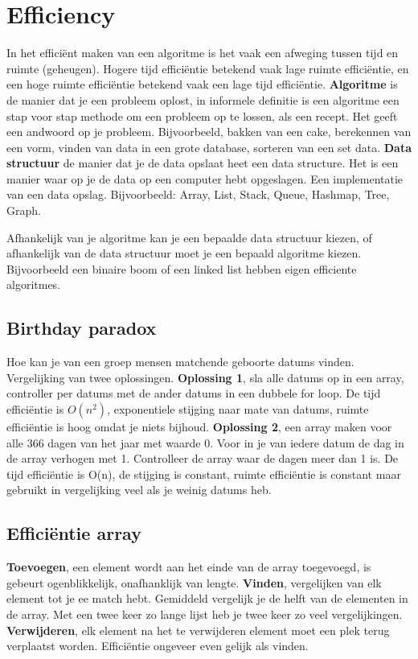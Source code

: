 \section{Efficiency}
In het efficiënt maken van een algoritme is het vaak een afweging tussen tijd en ruimte (geheugen).
Hogere tijd efficiëntie betekend vaak lage ruimte efficiëntie, en een hoge ruimte efficiëntie betekend vaak een lage tijd efficiëntie.
\textbf{Algoritme} is de manier dat je een probleem oplost, in informele definitie is een algoritme een stap voor stap methode om een probleem op te lossen, als een recept. Het geeft een andwoord op je probleem. Bijvoorbeeld, bakken van een cake, berekennen van een vorm, vinden van data in een grote database, sorteren van een set data.
\textbf{Data structuur} de manier dat je de data opslaat heet een data structure. Het is een manier waar op je de data op een computer hebt opgeslagen.
Een implementatie van een data opslag.
Bijvoorbeeld: Array, List, Stack, Queue, Hashmap, Tree, Graph.

Afhankelijk van je algoritme kan je een bepaalde data structuur kiezen, of afhankelijk van de data structuur moet je een bepaald algoritme kiezen.
Bijvoorbeeld een binaire boom of een linked list hebben eigen efficiente algoritmes.

\subsection{Birthday paradox}
Hoe kan je van een groep mensen matchende geboorte datums vinden.
Vergelijking van twee oplossingen.
\textbf{Oplossing 1}, sla alle datums op in een array, controller per datums met de ander datums in een dubbele for loop.
De tijd efficiëntie is $O(n^2)$, exponentiele stijging naar mate van datums, ruimte efficiëntie is hoog omdat je niets bijhoud.
\textbf{Oplossing 2}, een array maken voor alle 366 dagen van het jaar met waarde 0.
Voor in je van iedere datum de dag in de array verhogen met 1.
Controlleer de array waar de dagen meer dan 1 is.
De tijd efficiëntie is O(n), de stijging is constant, ruimte efficiëntie is constant maar gebruikt in vergelijking veel als je weinig datums heb.

\subsection{Efficiëntie array}
\textbf{Toevoegen}, een element wordt aan het einde van de array toegevoegd, is gebeurt ogenblikkelijk, onafhanklijk van lengte.
\textbf{Vinden}, vergelijken van elk element tot je ee match hebt.
Gemiddeld vergelijk je de helft van de elementen in de array.
Met een twee keer zo lange lijst heb je twee keer zo veel vergelijkingen.
\textbf{Verwijderen}, elk element na het te verwijderen element moet een plek terug verplaatst worden.
Efficiëntie ongeveer even gelijk als vinden.

